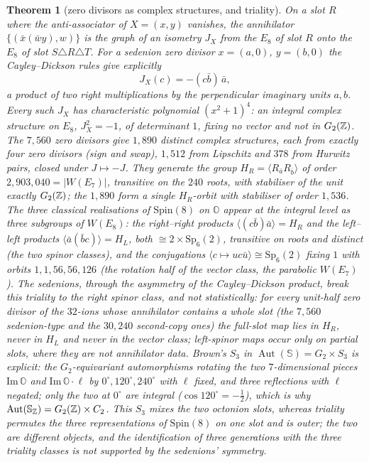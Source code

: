 \documentclass[11pt]{amsart}
\newtheorem{theorem}{Theorem}[section]
\theoremstyle{definition}
\begin{document}
\begin{theorem}[zero divisors as complex structures, and triality]\label{thm:complex}
On a slot $R$ where the anti-associator of $X=(x,y)$ vanishes, the annihilator $\{(\bar x(\bar wy),w)\}$ is the graph of an isometry $J_X$ from the $E_8$ of slot $R$ onto the $E_8$ of slot $S\triangle R\triangle T$. For a sedenion zero divisor $x=(a,0)$, $y=(b,0)$ the Cayley--Dickson rules give explicitly
\[J_X(c)=-(c\bar b)\,\bar a,\]
a product of two right multiplications by the perpendicular imaginary units $a,b$. Every such $J_X$ has characteristic polynomial $(x^2+1)^4$: an integral complex structure on $E_8$, $J_X^2=-1$, of determinant $1$, fixing no vector and not in $G_2(\mathbb{Z})$. The $7{,}560$ zero divisors give $1{,}890$ distinct complex structures, each from exactly four zero divisors (sign and swap), $1{,}512$ from Lipschitz and $378$ from Hurwitz pairs, closed under $J\mapsto-J$. They generate the group $H_R=\langle R_{\bar a}R_{\bar b}\rangle$ of order $2{,}903{,}040=|W(E_7)|$, transitive on the $240$ roots, with stabiliser of the unit exactly $G_2(\mathbb{Z})$; the $1{,}890$ form a single $H_R$-orbit with stabiliser of order $1{,}536$. The three classical realisations of $\mathrm{Spin}(8)$ on $\mathbb O$ appear at the integral level as three subgroups of $W(E_8)$: the right--right products $\langle(c\bar b)\bar a\rangle=H_R$ and the left--left products $\langle\bar a(\bar bc)\rangle=H_L$, both $\cong2\times\mathrm{Sp}_6(2)$, transitive on roots and distinct (the two spinor classes), and the conjugations $\langle c\mapsto uc\bar u\rangle\cong\mathrm{Sp}_6(2)$ fixing $1$ with orbits $1,1,56,56,126$ (the rotation half of the vector class, the parabolic $W(E_7)$). The sedenions, through the asymmetry of the Cayley--Dickson product, break this triality to the right spinor class, and not statistically: for every unit-half zero divisor of the $32$-ions whose annihilator contains a whole slot (the $7{,}560$ sedenion-type and the $30{,}240$ second-copy ones) the full-slot map lies in $H_R$, never in $H_L$ and never in the vector class; left-spinor maps occur only on partial slots, where they are not annihilator data. Brown's $S_3$ in $\operatorname{Aut}(\mathbb S)=G_2\times S_3$ is explicit: the $G_2$-equivariant automorphisms rotating the two $7$-dimensional pieces $\mathrm{Im}\,\mathbb O$ and $\mathrm{Im}\,\mathbb O\cdot\ell$ by $0^\circ,120^\circ,240^\circ$ with $\ell$ fixed, and three reflections with $\ell$ negated; only the two at $0^\circ$ are integral ($\cos120^\circ=-\tfrac12$), which is why $\operatorname{Aut}(\mathbb S_{\mathbb{Z}})=G_2(\mathbb{Z})\times C_2$. This $S_3$ mixes the two octonion slots, whereas triality permutes the three representations of $\mathrm{Spin}(8)$ on one slot and is outer; the two are different objects, and the identification of three generations with the three triality classes is not supported by the sedenions' symmetry.
\end{theorem}
\end{document}
